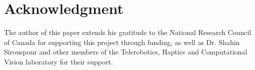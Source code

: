 \documentclass[conference]{IEEEtran}
\begin{document}
                    
                    
                

            

            
            

            




\section*{Acknowledgment}
The author of this paper extends his gratitude to the National Research Council of Canada for supporting this project through funding, as well as Dr. Shahin Sirouspour and other members of the Telerobotics, Haptics and Computational Vision laboratory for their support.  




\end{document}
